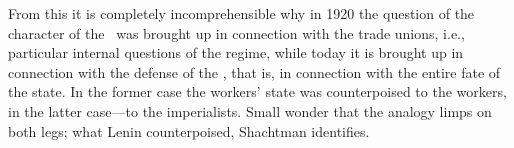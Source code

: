From this it is completely incomprehensible why in 1920 the question of the character of the \USSR\ was brought up in connection with the trade unions, i.e., particular internal questions of the regime, while today it is brought up in connection with the defense of the \USSR, that is, in connection with the entire fate of the state. In the former case the workers’ state was counterpoised to the workers, in the latter case---to the imperialists. Small wonder that the analogy limps on both legs; what Lenin counterpoised, Shachtman identifies.

